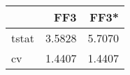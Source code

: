 \begin{tabular}{lrr}
\toprule
{} &     FF3 &    FF3* \\
\midrule
tstat &  3.5828 &  5.7070 \\
cv    &  1.4407 &  1.4407 \\
\bottomrule
\end{tabular}
